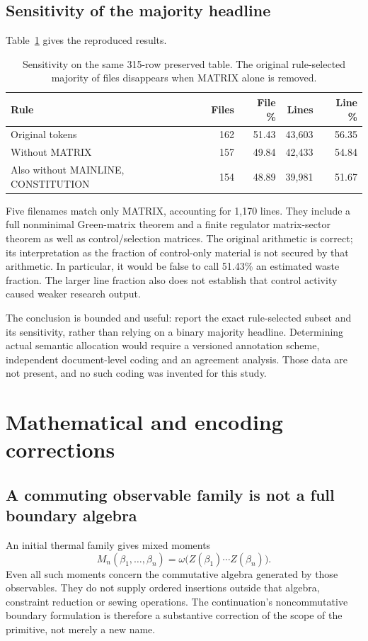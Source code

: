 \documentclass[11pt,a4paper]{article}
\begin{document}
\subsection{Sensitivity of the majority headline}
Table~\ref{tab:sensitivity} gives the reproduced results.
\begin{table}[htbp]
\centering\small
\caption{Sensitivity on the same 315-row preserved table. The original
rule-selected majority of files disappears when MATRIX alone is removed.}
\label{tab:sensitivity}
\begin{tabular}{p{}rrrr}
\toprule
Rule & Files & File \% & Lines & Line \%\\
\midrule
Original tokens &162&51.43&43,603&56.35\\
Without MATRIX &157&49.84&42,433&54.84\\
Also without MAINLINE, CONSTITUTION &154&48.89&39,981&51.67\\
\bottomrule
\end{tabular}
\end{table}
Five filenames match only MATRIX, accounting for 1,170 lines. They include
a full nonminimal Green-matrix theorem and a finite regulator matrix-sector
theorem as well as control/selection matrices. The original arithmetic is
correct; its interpretation as the fraction of control-only material is not
secured by that arithmetic. In particular, it would be false to call 51.43\%
an estimated waste fraction. The larger line fraction also does not establish
that control activity caused weaker research output.

The conclusion is bounded and useful: report the exact rule-selected subset
and its sensitivity, rather than relying on a binary majority headline.
Determining actual semantic allocation would require a versioned annotation
scheme, independent document-level coding and an agreement analysis. Those
data are not present, and no such coding was invented for this study.

\section{Mathematical and encoding corrections}
\subsection{A commuting observable family is not a full boundary algebra}
An initial thermal family gives mixed moments
\begin{equation}
M_n(\beta_1,\ldots,\beta_n)
=\omega\bigl(Z(\beta_1)\cdots Z(\beta_n)\bigr).
\end{equation}
Even all such moments concern the commutative algebra generated by those
observables. They do not supply ordered insertions outside that algebra,
constraint reduction or sewing operations. The continuation's noncommutative
boundary formulation is therefore a substantive correction of the scope of
the primitive, not merely a new name.
\end{document}
